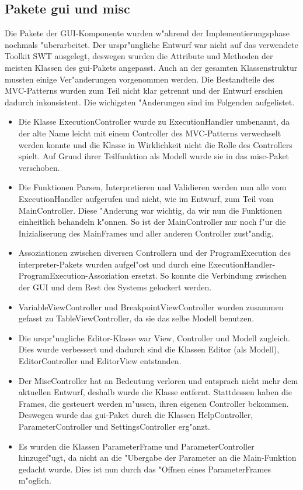 \subsection{Pakete gui und misc}
Die Pakete der GUI-Komponente wurden w"ahrend der Implementierungsphase nochmals "uberarbeitet. Der urspr"ungliche Entwurf war nicht auf das verwendete Toolkit SWT ausgelegt, deswegen wurden die Attribute und Methoden der meisten Klassen des gui-Pakets angepasst. Auch an der gesamten Klassenstruktur mussten einige Ver"anderungen vorgenommen werden. Die Bestandteile des MVC-Patterns wurden zum Teil nicht klar getrennt und der Entwurf erschien dadurch inkonsistent. Die wichigsten "Anderungen sind im Folgenden aufgelistet.
\begin{itemize}
\item Die Klasse ExecutionController wurde zu ExecutionHandler umbenannt, da der alte Name leicht mit einem Controller des MVC-Patterns verwechselt werden konnte und die Klasse in Wirklichkeit nicht die Rolle des Controllers spielt. Auf Grund ihrer Teilfunktion als Modell wurde sie in das misc-Paket verschoben.
\item Die Funktionen Parsen, Interpretieren und Validieren werden nun alle vom ExecutionHandler aufgerufen und nicht, wie im Entwurf, zum Teil vom MainController. Diese "Anderung war wichtig, da wir nun die Funktionen einheitlich behandeln k"onnen. So ist der MainController nur noch f"ur die Inizialiserung des MainFrames und aller anderen Controller zust"andig.
\item Assoziationen zwischen diversen Controllern und der ProgramExecution des interpreter-Pakets wurden aufgel"ost und durch eine ExecutionHandler-ProgramExecution-Assoziation ersetzt. So konnte die Verbindung zwischen der GUI und dem Rest des Systems gelockert werden.
\item VariableViewController und BreakpointViewController wurden zusammen gefasst zu TableViewController, da sie das selbe Modell benutzen.
\item Die urspr"ungliche Editor-Klasse war View, Controller und Modell zugleich. Dies wurde verbessert und dadurch sind die Klassen Editor (als Modell), EditorController und EditorView entstanden.
\item Der MiscController hat an Bedeutung verloren und entsprach nicht mehr dem aktuellen Entwurf, deshalb wurde die Klasse entfernt. Stattdessen haben die Frames, die gesteuert werden m"ussen, ihren eigenen Controller bekommen. Deswegen wurde das gui-Paket durch die Klassen HelpController, ParameterController und SettingsController erg"anzt.
\item Es wurden die Klassen ParameterFrame und ParameterController hinzugef"ugt, da nicht an die "Ubergabe der Parameter an die Main-Funktion gedacht wurde. Dies ist nun durch das "Offnen eines ParameterFrames m"oglich.
\end{itemize}
